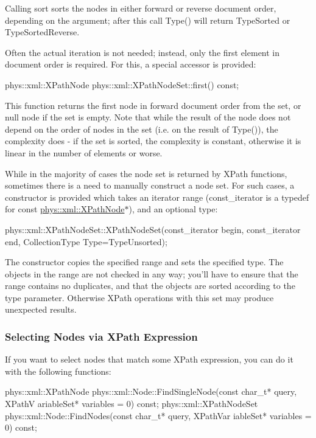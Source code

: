 Calling sort sorts the nodes in either forward or reverse document order, depending on the argument; after this call Type() will return TypeSorted or TypeSortedReverse. \par
 \par
 Often the actual iteration is not needed; instead, only the first element in document order is required. For this, a special accessor is provided: 
\begin{DoxyCode}
 phys::xml::XPathNode phys::xml::XPathNodeSet::first() const;
\end{DoxyCode}
 This function returns the first node in forward document order from the set, or null node if the set is empty. Note that while the result of the node does not depend on the order of nodes in the set (i.e. on the result of Type()), the complexity does -\/ if the set is sorted, the complexity is constant, otherwise it is linear in the number of elements or worse. \par
 \par
 While in the majority of cases the node set is returned by XPath functions, sometimes there is a need to manually construct a node set. For such cases, a constructor is provided which takes an iterator range (const\_\-iterator is a typedef for const \hyperlink{classphys_1_1xml_1_1XPathNode}{phys::xml::XPathNode}$\ast$), and an optional type: 
\begin{DoxyCode}
 phys::xml::XPathNodeSet::XPathNodeSet(const_iterator begin, const_iterator end, 
      CollectionType Type=TypeUnsorted);
\end{DoxyCode}
 The constructor copies the specified range and sets the specified type. The objects in the range are not checked in any way; you'll have to ensure that the range contains no duplicates, and that the objects are sorted according to the type parameter. Otherwise XPath operations with this set may produce unexpected results. \par
 \par
 \hypertarget{XMLManual_XMLXPathSelecting}{}\subsubsection{Selecting Nodes via XPath Expression}\label{XMLManual_XMLXPathSelecting}
If you want to select nodes that match some XPath expression, you can do it with the following functions: 
\begin{DoxyCode}
 phys::xml::XPathNode phys::xml::Node::FindSingleNode(const char_t* query, XPathV
      ariableSet* variables = 0) const;
 phys::xml::XPathNodeSet phys::xml::Node::FindNodes(const char_t* query, XPathVar
      iableSet* variables = 0) const;
\end{DoxyCode}

